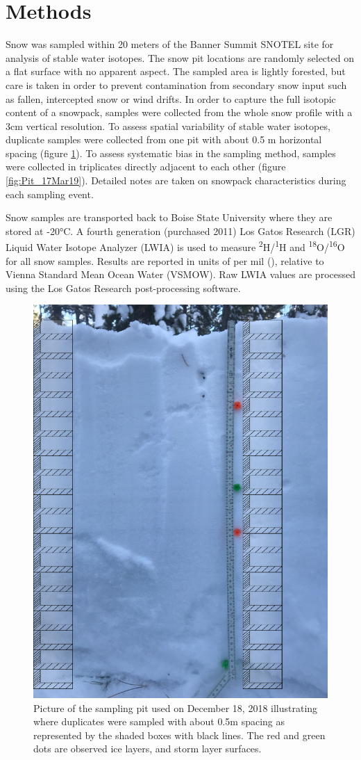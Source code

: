 \section{Methods}
Snow was sampled within 20 meters of the Banner Summit SNOTEL site for analysis of stable water isotopes. The snow pit locations are randomly selected on a flat surface with no apparent aspect. The sampled area is lightly forested, but care is taken in order to prevent contamination from secondary snow input such as fallen, intercepted snow or wind drifts. In order to capture the full isotopic content of a snowpack, samples were collected from the whole snow profile with a 3cm vertical resolution. To assess spatial variability of stable water isotopes, duplicate samples were collected from one pit with about 0.5 m horizontal spacing (figure \ref{fig:Pit_18Dec19}). To assess systematic bias in the sampling method, samples were collected in triplicates directly adjacent to each other (figure \ref{fig:Pit_17Mar19}). Detailed notes are taken on snowpack characteristics during each sampling event.

Snow samples are transported back to Boise State University where they are stored at -20°C. A fourth generation (purchased 2011) Los Gatos Research (LGR) Liquid Water Isotope Analyzer (LWIA) is used to measure \textsuperscript{2}H/\textsuperscript{1}H and \textsuperscript{18}O/\textsuperscript{16}O for all snow samples. Results are reported in units of per mil (\textperthousand), relative to Vienna Standard Mean Ocean Water (VSMOW). Raw LWIA values are processed using the Los Gatos Research post-processing software.

 \begin{figure}[H]
    \centering
    \includegraphics[width=0.4\linewidth]{figures/Pit_18Dec19.png}
    \caption{Picture of the sampling pit used on December 18, 2018 illustrating where duplicates were sampled with about 0.5m spacing as represented by the shaded boxes with black lines. The red and green dots are observed ice layers, and storm layer surfaces.}
    \label{fig:Pit_18Dec19}
 \end{figure}
 
